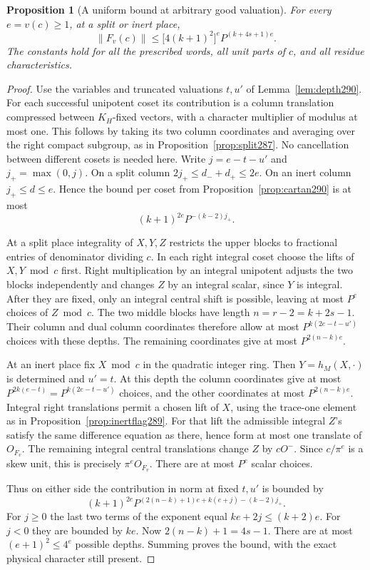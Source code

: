\documentclass[a4paper,11pt]{article}
\newtheorem{proposition}{Proposition}[section]
\theoremstyle{definition}
\theoremstyle{remark}
\numberwithin{equation}{section}
\begin{document}
\begin{proposition}[A uniform bound at arbitrary good valuation]\leavevmode
\label{prop:powers290}
For every \(e=v(c)\ge1\), at a split or inert place,
\[
       \|F_v(c)\|
          \le \bigl[4(k+1)^2\bigr]^e P^{(k+4s+1)e}.
\]
The constants hold for all the prescribed words, all unit
parts of \(c\), and all residue characteristics.
\end{proposition}
\begin{proof}
Use the variables and truncated valuations \(t,u'\) of
Lemma~\ref{lem:depth290}. For each successful unipotent
coset its contribution is a column translation compressed
between \(K_H\)-fixed vectors, with a character multiplier
of modulus at most one. This follows by taking its two
column coordinates and averaging over the right compact
subgroup, as in Proposition~\ref{prop:split287}. No
cancellation between different cosets is needed here.
Write \(j=e-t-u'\) and \(j_+=\max(0,j)\). On a split
column \(2j_+\le d_-+d_+\le2e\). On an inert column
\(j_+\le d\le e\). Hence the bound per coset from
Proposition~\ref{prop:cartan290} is at most
\[
               (k+1)^{2e}P^{-(k-2)j_+}.
\]

At a split place integrality of \(X,Y,Z\) restricts
the upper blocks to fractional entries of denominator
dividing \(c\). In each right integral coset choose
the lifts of \(X,Y\bmod c\) first. Right multiplication
by an integral unipotent adjusts the two blocks independently
and changes \(Z\) by an integral scalar, since \(Y\) is
integral. After they are fixed, only an integral central
shift is possible, leaving at most \(P^e\) choices of
\(Z\bmod c\). The two middle blocks have length
\(n=r-2=k+2s-1\). Their column and dual column coordinates
therefore allow at most \(P^{k(2e-t-u')}\) choices with
these depths. The remaining coordinates give at most
\(P^{2(n-k)e}\).

At an inert place fix \(X\bmod c\) in the quadratic
integer ring. Then \(Y=h_M(X,\cdot)\) is determined and
\(u'=t\). At this depth the column coordinates give at most
\(P^{2k(e-t)}=P^{k(2e-t-u')}\) choices, and the other
coordinates at most \(P^{2(n-k)e}\). Integral right
translations permit a chosen lift of \(X\), using the
trace-one element as in Proposition~\ref{prop:inertflag289}.
For that lift the admissible integral \(Z\)'s satisfy the
same difference equation as there, hence form at most
one translate of \(O_{F_v}\). The remaining integral
central translations change \(Z\) by \(cO^-\).
Since \(c/\pi^e\) is a skew unit, this is precisely
\(\pi^e O_{F_v}\). There are at most \(P^e\) scalar choices.

Thus on either side the contribution in norm at fixed
\(t,u'\) is bounded by
\[
  (k+1)^{2e}
     P^{(2(n-k)+1)e+k(e+j)-(k-2)j_+}.
\]
For \(j\ge0\) the last two terms of the exponent equal
\(ke+2j\le(k+2)e\). For \(j<0\) they are bounded by
\(ke\). Now \(2(n-k)+1=4s-1\). There are at most
\((e+1)^2\le4^e\) possible depths. Summing proves the
bound, with the exact physical character still present.
\end{proof}
\end{document}
